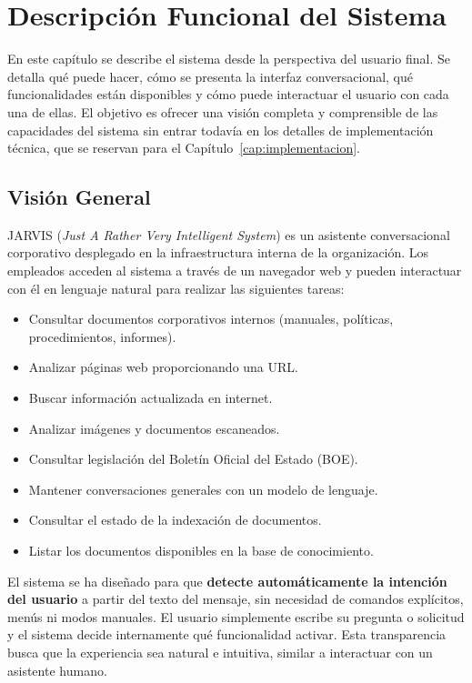 \chapter{Descripción Funcional del Sistema}
\label{cap:funcional}

En este capítulo se describe el sistema desde la perspectiva del usuario final. Se detalla qué puede hacer, cómo se presenta la interfaz conversacional, qué funcionalidades están disponibles y cómo puede interactuar el usuario con cada una de ellas. El objetivo es ofrecer una visión completa y comprensible de las capacidades del sistema sin entrar todavía en los detalles de implementación técnica, que se reservan para el Capítulo~\ref{cap:implementacion}.

\section{Visión General}

JARVIS (\textit{Just A Rather Very Intelligent System}) es un asistente conversacional corporativo desplegado en la infraestructura interna de la organización. Los empleados acceden al sistema a través de un navegador web y pueden interactuar con él en lenguaje natural para realizar las siguientes tareas:

\begin{itemize}
    \item Consultar documentos corporativos internos (manuales, políticas, procedimientos, informes).
    \item Analizar páginas web proporcionando una URL.
    \item Buscar información actualizada en internet.
    \item Analizar imágenes y documentos escaneados.
    \item Consultar legislación del Boletín Oficial del Estado (BOE).
    \item Mantener conversaciones generales con un modelo de lenguaje.
    \item Consultar el estado de la indexación de documentos.
    \item Listar los documentos disponibles en la base de conocimiento.
\end{itemize}

El sistema se ha diseñado para que \textbf{detecte automáticamente la intención del usuario} a partir del texto del mensaje, sin necesidad de comandos explícitos, menús ni modos manuales. El usuario simplemente escribe su pregunta o solicitud y el sistema decide internamente qué funcionalidad activar. Esta transparencia busca que la experiencia sea natural e intuitiva, similar a interactuar con un asistente humano.

